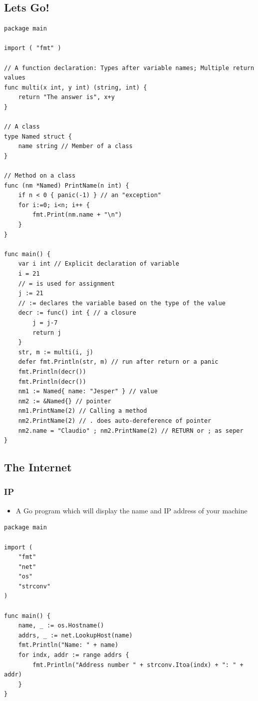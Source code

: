 \documentclass[11pt]{article}
\begin{document}
\subsection{Lets Go!}
\label{sec:org63042c9}
\begin{verbatim}
package main 

import ( "fmt" )

// A function declaration: Types after variable names; Multiple return values
func multi(x int, y int) (string, int) {
	return "The answer is", x+y
}

// A class
type Named struct {
	name string // Member of a class
}

// Method on a class
func (nm *Named) PrintName(n int) {
	if n < 0 { panic(-1) } // an "exception"
	for i:=0; i<n; i++ {
		fmt.Print(nm.name + "\n")
	}
}

func main() {
	var i int // Explicit declaration of variable
	i = 21
	// = is used for assignment
	j := 21
	// := declares the variable based on the type of the value
	decr := func() int { // a closure
		j = j-7
		return j
	}
	str, m := multi(i, j)
	defer fmt.Println(str, m) // run after return or a panic
	fmt.Println(decr())
	fmt.Println(decr())
	nm1 := Named{ name: "Jesper" } // value
	nm2 := &Named{} // pointer
	nm1.PrintName(2) // Calling a method
	nm2.PrintName(2) // . does auto-dereference of pointer
	nm2.name = "Claudio" ; nm2.PrintName(2) // RETURN or ; as seper
}
\end{verbatim}
\subsection{The Internet}
\label{sec:org5951895}
\subsubsection{IP}
\label{sec:org5049f7f}
\begin{itemize}
\item A Go program which will display the name and IP address of your machine
\end{itemize}
\begin{verbatim}
package main

import (
	"fmt"
	"net"
	"os"
	"strconv"
)

func main() {
	name, _ := os.Hostname()
	addrs, _ := net.LookupHost(name)
	fmt.Println("Name: " + name)
	for indx, addr := range addrs {
		fmt.Println("Address number " + strconv.Itoa(indx) + ": " + addr)
	}
}
\end{verbatim}
\end{document}
